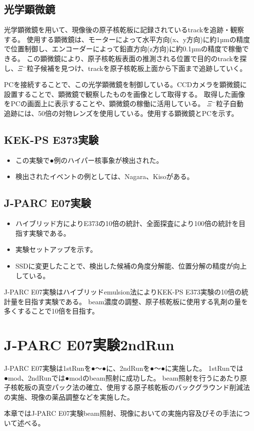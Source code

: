 \documentclass[12pt,a4paper]{jarticle}
\begin{document}
\subsection{光学顕微鏡}
光学顕微鏡を用いて、現像後の原子核乾板に記録されているtrackを追跡・観察する。
使用する顕微鏡は、モーターによって水平方向(x、y方向)に約1µmの精度で位置制御し、エンコーダーによって鉛直方向(z方向)に約0.1µmの精度で稼働できる。
この顕微鏡により、原子核乾板表面の推測される位置で目的のtrackを探し、$\Xi$$^-$粒子候補を見つけ、trackを原子核乾板上面から下面まで追跡していく。
\par
PCを接続することで、この光学顕微鏡を制御している。CCDカメラを顕微鏡に設置することで、顕微鏡で観察したものを画像として取得する。
取得した画像をPCの画面上に表示することや、顕微鏡の稼働に活用している。
$\Xi$$^-$粒子自動追跡には、50倍の対物レンズを使用している。使用する顕微鏡とPCを示す。
\subsection{KEK-PS E373実験}
\begin{itemize}
    \item この実験で●例のハイパー核事象が検出された。
    \item 検出されたイベントの例としては、Nagara、Kisoがある。
\end{itemize}
\subsection{J-PARC E07実験}
\begin{itemize}
    \item ハイブリッド方によりE373の10倍の統計、全面探査により100倍の統計を目指す実験である。
    \item 実験セットアップを示す。
    \item SSDに変更したことで、検出した候補の角度分解能、位置分解の精度が向上している。
\end{itemize}
J-PARC E07実験はハイブリッドemulsion法によりKEK-PS E373実験の10倍の統計量を目指す実験である。
beam濃度の調整、原子核乾板に使用する乳剤の量を多くすることで10倍を目指す。



\newpage
\section{J-PARC E07実験2ndRun}
J-PARC E07実験は1stRunを●～●に、2ndRunを●～●に実施した。
1stRunでは●mod、2ndRunでは●modのbeam照射に成功した。
beam照射を行うにあたり原子核乾板の真空パック法の確立、使用する原子核乾板のバックグラウンド削減法の実施、現像の薬品調整などを実施した。
\par
本章ではJ-PARC E07実験beam照射、現像においての実施内容及びその手法について述べる。
\end{document}
